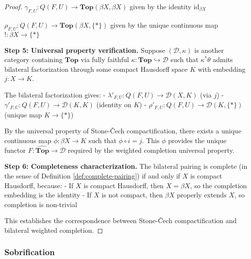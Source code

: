 \documentclass[11pt]{article}
\theoremstyle{plain}
\theoremstyle{definition}
\theoremstyle{remark}
\begin{document}
\begin{proof}
$\gamma_{F,U} : Q(F, U) \to \mathbf{Top}(\beta X, \beta X)$ given by the identity $\text{id}_{\beta X}$

$\rho_{F,U} : Q(F, U) \to \mathbf{Top}(\beta X, \{*\})$ given by the unique continuous map $! : \beta X \to \{*\}$

\textbf{Step 5: Universal property verification.}
Suppose $(\mathcal{D}, \kappa)$ is another category containing $\mathbf{Top}$ via fully faithful $\kappa : \mathbf{Top} \hookrightarrow \mathcal{D}$ such that $\kappa^* \theta$ admits bilateral factorization through some compact Hausdorff space $K$ with embedding $j : X \to K$.

The bilateral factorization gives:
- $\lambda'_{F,U} : Q(F, U) \to \mathcal{D}(X, K)$ (via $j$)
- $\gamma'_{F,U} : Q(F, U) \to \mathcal{D}(K, K)$ (identity on $K$)  
- $\rho'_{F,U} : Q(F, U) \to \mathcal{D}(K, \{*\})$ (unique map $K \to \{*\}$)

By the universal property of Stone-\v{C}ech compactification, there exists a unique continuous map $\phi : \beta X \to K$ such that $\phi \circ i = j$. This $\phi$ provides the unique functor $F : \widehat{\mathbf{Top}} \to \mathcal{D}$ required by the weighted completion universal property.

\textbf{Step 6: Completeness characterization.}
The bilateral pairing is complete (in the sense of Definition \ref{def:complete-pairing}) if and only if $X$ is compact Hausdorff, because:
- If $X$ is compact Hausdorff, then $X = \beta X$, so the completion embedding is the identity
- If $X$ is not compact, then $\beta X$ properly extends $X$, so completion is non-trivial

This establishes the correspondence between Stone-\v{C}ech compactification and bilateral weighted completion.
\end{proof}

\subsubsection{Sobrification}
\end{document}
